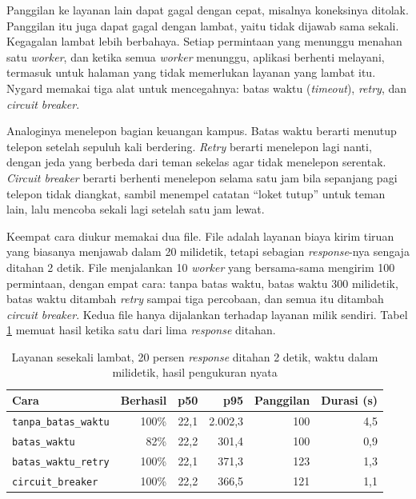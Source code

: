 Panggilan ke layanan lain dapat gagal dengan cepat, misalnya koneksinya
ditolak. Panggilan itu juga dapat gagal dengan lambat, yaitu tidak dijawab
sama sekali. Kegagalan lambat lebih berbahaya. Setiap permintaan yang menunggu
menahan satu \textit{worker}, dan ketika semua \textit{worker} menunggu, aplikasi berhenti
melayani, termasuk untuk halaman yang tidak memerlukan layanan yang lambat itu.
Nygard \cite{nygard2018releaseit} memakai tiga alat untuk mencegahnya: batas
waktu (\textit{timeout}), \textit{retry}, dan \textit{circuit breaker}.

Analoginya menelepon bagian keuangan kampus. Batas waktu berarti menutup
telepon setelah sepuluh kali berdering. \textit{Retry} berarti menelepon lagi
nanti, dengan jeda yang berbeda dari teman sekelas agar tidak menelepon
serentak. \textit{Circuit breaker} berarti berhenti menelepon selama satu jam bila
sepanjang pagi telepon tidak diangkat, sambil menempel catatan ``loket tutup''
untuk teman lain, lalu mencoba sekali lagi setelah satu jam lewat.

Keempat cara diukur memakai dua file. File
 adalah layanan biaya kirim tiruan
yang biasanya menjawab dalam 20 milidetik, tetapi sebagian \textit{response}-nya sengaja
ditahan 2 detik. File  menjalankan
10 \textit{worker} yang bersama-sama mengirim 100 permintaan, dengan empat cara:
tanpa batas waktu, batas waktu 300 milidetik, batas waktu ditambah \textit{retry}
sampai tiga percobaan, dan semua itu ditambah \textit{circuit breaker}. Kedua
file hanya
dijalankan terhadap layanan milik sendiri. Tabel \ref{tab:hasil-sesekali}
memuat hasil ketika satu dari lima \textit{response} ditahan.

\begin{table}[!htb]
  \centering
  \caption{Layanan sesekali lambat, 20 persen \textit{response} ditahan 2 detik, waktu
           dalam milidetik, hasil pengukuran nyata}
  \label{tab:hasil-sesekali}
  \begin{tabularx}{\textwidth}{Xrrrrr}
    \hline
    \textbf{Cara} & \textbf{Berhasil} & \textbf{p50} & \textbf{p95} & \textbf{Panggilan} & \textbf{Durasi (s)} \\
    \hline
    \texttt{tanpa\_batas\_waktu} & 100\% & 22,1 & 2.002,3 & 100 & 4,5 \\
    \hline
    \texttt{batas\_waktu} & 82\% & 22,2 & 301,4 & 100 & 0,9 \\
    \hline
    \texttt{batas\_waktu\_retry} & 100\% & 22,1 & 371,3 & 123 & 1,3 \\
    \hline
    \texttt{circuit\_breaker} & 100\% & 22,2 & 366,5 & 121 & 1,1 \\
    \hline
  \end{tabularx}
\end{table}


